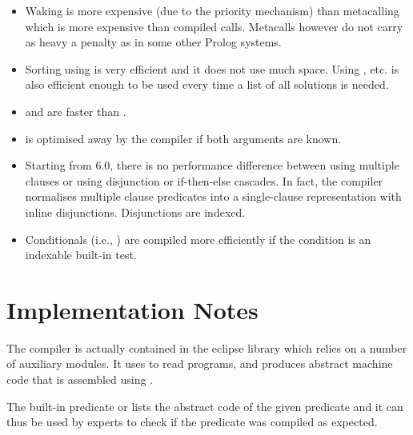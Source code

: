 \begin{itemize}
\item Waking is more expensive (due to the priority mechanism) than metacalling
which is more expensive than compiled calls.
Metacalls however do not carry as heavy a penalty as in
some other Prolog systems.

\item Sorting using  is very
  efficient and it does not use
much space.
Using ,
 etc. is also efficient
enough
to be used every time a list of all solutions is needed.


\item {} and
are faster than
.

\item {} is optimised away
  by the compiler
if both arguments are known.

\item Starting from {\eclipse} 6.0, there is no performance difference between
using multiple clauses or using disjunction or if-then-else cascades.
In fact, the compiler normalises multiple clause predicates into
a single-clause representation with inline disjunctions.
Disjunctions are indexed.

\item Conditionals
(i.e., \notation{$\ldots$->$\ldots$;$\ldots$}) are compiled
more efficiently if the condition is an indexable built-in test.

\end{itemize}


\section{Implementation Notes}

The {\eclipse} compiler is actually contained in the eclipse library
 which relies on a number of auxiliary modules.
It uses
to read programs, and produces abstract
machine code that is assembled using
.

The built-in predicate 
or 
lists the abstract code of the given predicate and it can thus be used by
experts
to check if the predicate was compiled as expected.








